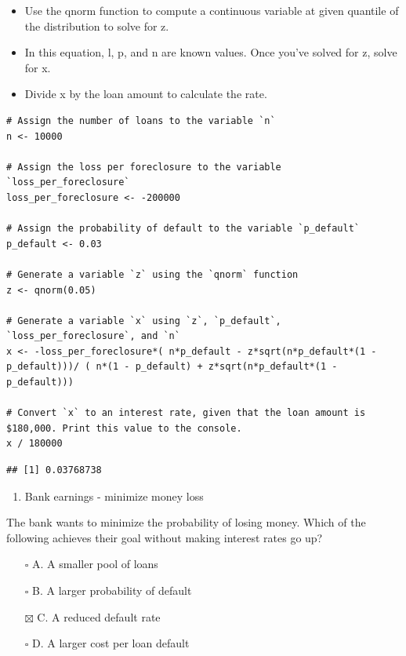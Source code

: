 \documentclass[
]{article}
\providecommand{\tightlist}{%
  \setlength{\itemsep}{0pt}\setlength{\parskip}{0pt}}
\begin{document}
\begin{itemize}
\tightlist
\item
  Use the qnorm function to compute a continuous variable at given
  quantile of the distribution to solve for z.
\item
  In this equation, l, p, and n are known values. Once you've solved for
  z, solve for x.
\item
  Divide x by the loan amount to calculate the rate.
\end{itemize}

\begin{verbatim}
# Assign the number of loans to the variable `n`
n <- 10000

# Assign the loss per foreclosure to the variable `loss_per_foreclosure`
loss_per_foreclosure <- -200000

# Assign the probability of default to the variable `p_default`
p_default <- 0.03

# Generate a variable `z` using the `qnorm` function
z <- qnorm(0.05)

# Generate a variable `x` using `z`, `p_default`, `loss_per_foreclosure`, and `n`
x <- -loss_per_foreclosure*( n*p_default - z*sqrt(n*p_default*(1 - p_default)))/ ( n*(1 - p_default) + z*sqrt(n*p_default*(1 - p_default)))

# Convert `x` to an interest rate, given that the loan amount is $180,000. Print this value to the console.
x / 180000
\end{verbatim}

\begin{verbatim}
## [1] 0.03768738
\end{verbatim}

\begin{enumerate}
\def\labelenumi{\arabic{enumi}.}
\setcounter{enumi}{6}
\tightlist
\item
  Bank earnings - minimize money loss
\end{enumerate}

The bank wants to minimize the probability of losing money. Which of the
following achieves their goal without making interest rates go up?

\begin{itemize}
\tightlist
\item[$\square$]
  A. A smaller pool of loans
\item[$\square$]
  B. A larger probability of default
\item[$\boxtimes$]
  C. A reduced default rate
\item[$\square$]
  D. A larger cost per loan default
\end{itemize}
\end{document}
